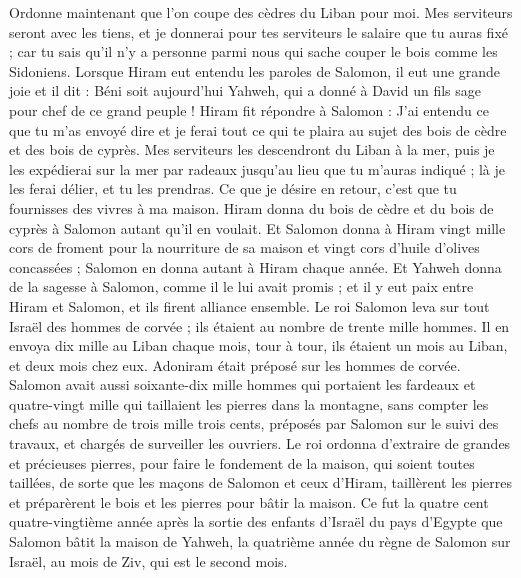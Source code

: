 \begin{multicols}{2}
Ordonne maintenant que l’on coupe des cèdres du Liban pour moi. Mes serviteurs seront avec les tiens, et je donnerai pour tes serviteurs le salaire que tu auras fixé ; car tu sais qu'il n'y a personne parmi nous qui sache couper le bois comme les Sidoniens.
Lorsque Hiram eut entendu les paroles de Salomon, il eut une grande joie et il dit : Béni soit aujourd'hui Yahweh, qui a donné à David un fils sage pour chef de ce grand peuple !
Hiram fit répondre à Salomon : J'ai entendu ce que tu m'as envoyé dire et je ferai tout ce qui te plaira au sujet des bois de cèdre et des bois de cyprès.
Mes serviteurs les descendront du Liban à la mer, puis je les expédierai sur la mer par radeaux jusqu'au lieu que tu m'auras indiqué ; là je les ferai délier, et tu les prendras. Ce que je désire en retour, c’est que tu fournisses des vivres à ma maison.
Hiram donna du bois de cèdre et du bois de cyprès à Salomon autant qu'il en voulait.
Et Salomon donna à Hiram vingt mille cors de froment pour la nourriture de sa maison et vingt cors d'huile d’olives concassées ; Salomon en donna autant à Hiram chaque année.
Et Yahweh donna de la sagesse à Salomon, comme il le lui avait promis ; et il y eut paix entre Hiram et Salomon, et ils firent alliance ensemble.
Le roi Salomon leva sur tout Israël des hommes de corvée ; ils étaient au nombre de trente mille hommes.
Il en envoya dix mille au Liban chaque mois, tour à tour, ils étaient un mois au Liban, et deux mois chez eux. Adoniram était préposé sur les hommes de corvée.
Salomon avait aussi soixante-dix mille hommes qui portaient les fardeaux et quatre-vingt mille qui taillaient les pierres dans la montagne,
sans compter les chefs au nombre de trois mille trois cents, préposés par Salomon sur le suivi des travaux, et chargés de surveiller les ouvriers.
Le roi ordonna d’extraire de grandes et précieuses pierres, pour faire le fondement de la maison, qui soient toutes taillées,
de sorte que les maçons de Salomon et ceux d'Hiram, taillèrent les pierres et préparèrent le bois et les pierres pour bâtir la maison.
\VerseOne{}Ce fut la quatre cent quatre-vingtième année après la sortie des enfants d'Israël du pays d'Egypte que Salomon bâtit la maison de Yahweh, la quatrième année du règne de Salomon sur Israël, au mois de Ziv, qui est le second mois.

\end{multicols}
